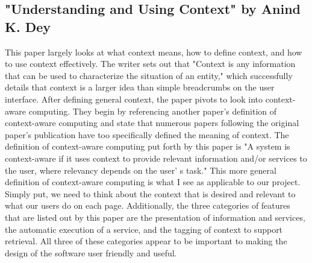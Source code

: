 \documentclass[sigchi]{acmart}
\begin{document}
		\subsection{"Understanding and Using Context" by Anind K. Dey}
			This paper largely looks at what context means, how to define context, and how to use context effectively. The writer sets out that "Context is any information that can be used to characterize the situation of an entity," which successfully details that context is a larger idea than simple breadcrumbs on the user interface. After defining general context, the paper pivots to look into context-aware computing. They begin by referencing another paper's definition of context-aware computing and state that numerous papers following the original paper's publication have too specifically defined the meaning of context.
			The definition of context-aware computing put forth by this paper is "A system is context-aware if it uses context to provide relevant information and/or services to the user, where relevancy depends on the user' s task." This more general definition of context-aware computing is what I see as applicable to our project. Simply put, we need to think about the context that is desired and relevant to what our users do on each page. Additionally, the three categories of features that are listed out by this paper are the presentation of information and services, the automatic execution of a service, and the tagging of context to support retrieval. All three of these categories appear to be important to making the design of the software user friendly and useful.
\end{document}
